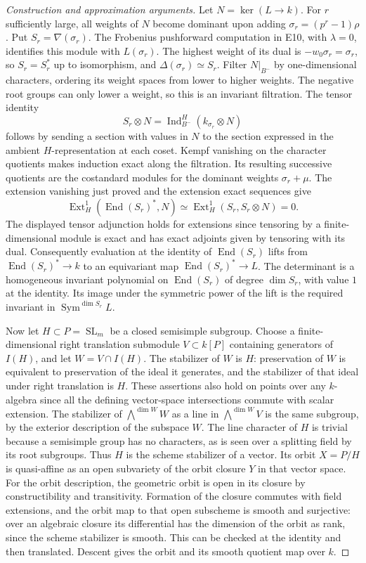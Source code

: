 \documentclass[11pt,a4paper,openany,oneside]{book}
\theoremstyle{resultstyle}
\theoremstyle{definition}
\numberwithin{equation}{chapter}
\begin{document}
\begin{proof}[Construction and approximation arguments]
Let \(N=\ker(L\to k)\). For \(r\) sufficiently large, all weights
of \(N\) become dominant upon adding
\(\sigma_r=(p^r-1)\rho\). Put \(S_r=\nabla(\sigma_r)\).
The Frobenius pushforward computation in E10, with
\(\lambda=0\), identifies this module with \(L(\sigma_r)\).
The highest weight of its dual is \(-w_0\sigma_r=\sigma_r\),
so \(S_r=S_r^*\) up to isomorphism, and
\(\Delta(\sigma_r)\simeq S_r\). Filter \(N|_{B^-}\) by
one-dimensional characters, ordering its weight spaces
from lower to higher weights. The negative root groups can
only lower a weight, so this is an invariant filtration.
The tensor identity
\[
 S_r\otimes N=\operatorname{Ind}_{B^-}^H(k_{\sigma_r}\otimes N)
\]
follows by sending a section with values in \(N\) to the
section expressed in the ambient \(H\)-representation at each
coset. Kempf vanishing on the character quotients makes
induction exact along the filtration. Its resulting
successive quotients are the costandard modules for the
dominant weights \(\sigma_r+\mu\). The extension vanishing
just proved and the extension exact sequences give
\[
 \operatorname{Ext}^1_H(\operatorname{End}(S_r)^*,N)
 \simeq \operatorname{Ext}^1_H(S_r,S_r\otimes N)=0 .
\]
The displayed tensor adjunction holds for extensions since
tensoring by a finite-dimensional module is exact and has
exact adjoints given by tensoring with its dual. Consequently
evaluation at the identity of \(\operatorname{End}(S_r)\)
lifts from \(\operatorname{End}(S_r)^*\to k\) to an equivariant
map \(\operatorname{End}(S_r)^*\to L\). The determinant is a
homogeneous invariant polynomial on \(\operatorname{End}(S_r)\)
of degree \(\dim S_r\), with value \(1\) at the identity.
Its image under the symmetric power of the lift is the
required invariant in \(\operatorname{Sym}^{\dim S_r}L\).

Now let \(H\subset P=\operatorname{SL}_m\) be a closed
semisimple subgroup. Choose a finite-dimensional right
translation submodule \(V\subset k[P]\) containing generators
of \(I(H)\), and let \(W=V\cap I(H)\). The stabilizer of \(W\)
is \(H\): preservation of \(W\) is equivalent to preservation
of the ideal it generates, and the stabilizer of that ideal
under right translation is \(H\). These assertions also hold
on points over any \(k\)-algebra since all the defining
vector-space intersections commute with scalar extension.
The stabilizer of \(\bigwedge^{\dim W}W\) as a line in
\(\bigwedge^{\dim W}V\) is the same subgroup, by the
exterior description of the subspace \(W\). The line
character of \(H\) is trivial because a semisimple group
has no characters, as is seen over a splitting field by its
root subgroups. Thus \(H\) is the scheme stabilizer of a
vector. Its orbit \(X=P/H\) is quasi-affine as an open
subvariety of the orbit closure \(Y\) in that vector space.
For the orbit description, the geometric orbit is open in
its closure by constructibility and transitivity. Formation
of the closure commutes with field extensions, and the orbit
map to that open subscheme is smooth and surjective:
over an algebraic closure its differential has the dimension
of the orbit as rank, since the scheme stabilizer is smooth.
This can be checked at the identity and then translated.
Descent gives the orbit and its smooth quotient map over
\(k\).


\end{proof}
\end{document}
